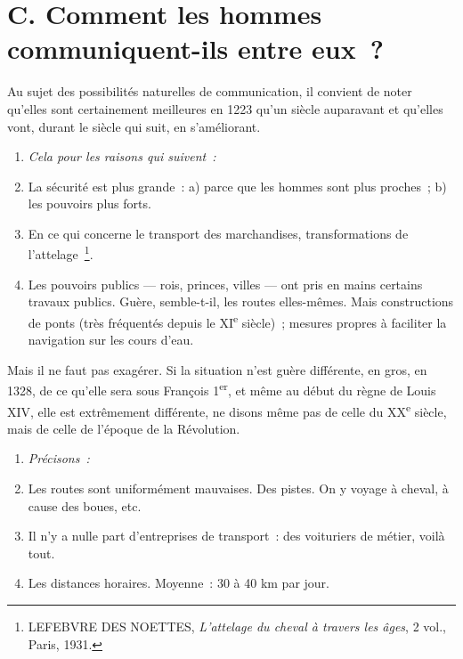 \documentclass[french,twoside]{book} %
\newlength{\listmod}
\newcommand{\listhead}[1]{\hspace{-1\listmod}\emph{#1}}
\begin{document}
\section[{C. Comment les hommes communiquent-ils entre eux ?}]{C. Comment les hommes communiquent-ils entre eux ?}
\label{c02c}
\noindent  {}
\label{p10} Au sujet des possibilités naturelles de communication, il convient de noter qu’elles sont certainement meilleures en 1223 qu’un siècle auparavant et qu’elles vont, durant le siècle qui suit, en s’améliorant.\par

\begin{enumerate}[itemsep=0pt,]
\item[]\listhead{Cela pour les raisons qui suivent :}
\item La sécurité est plus grande : a) parce que les hommes sont plus proches ; b) les pouvoirs plus forts.
\item En ce qui concerne le transport des marchandises, transformations de l’attelage \footnote{ LEFEBVRE DES NOETTES, {\itshape L’attelage du cheval à travers les âges}, 2 vol., Paris, 1931.}.
\item Les pouvoirs publics — rois, princes, villes — ont pris en mains certains travaux publics. Guère, semble-t-il, les routes elles-mêmes. Mais constructions de ponts (très fréquentés depuis le XI\textsuperscript{e} siècle) ; mesures propres à faciliter la navigation sur les cours d’eau.
\end{enumerate}

\noindent Mais il ne faut pas exagérer. Si la situation n’est guère différente, en gros, en 1328, de ce qu’elle sera sous François 1\textsuperscript{er}, et même au début du règne de Louis XIV, elle est extrêmement différente, ne disons même pas de celle du XX\textsuperscript{e} siècle, mais de celle de l’époque de la Révolution.\par

\begin{enumerate}[itemsep=0pt,]
\item[]\listhead{Précisons :}
\item Les routes sont uniformément mauvaises. Des pistes. On y voyage à cheval, à cause des boues, etc.
\item Il n’y a nulle part d’entreprises de transport : des voituriers de métier, voilà tout.
\item Les distances horaires. Moyenne : 30 à 40 km par jour.
\end{enumerate}
\end{document}
